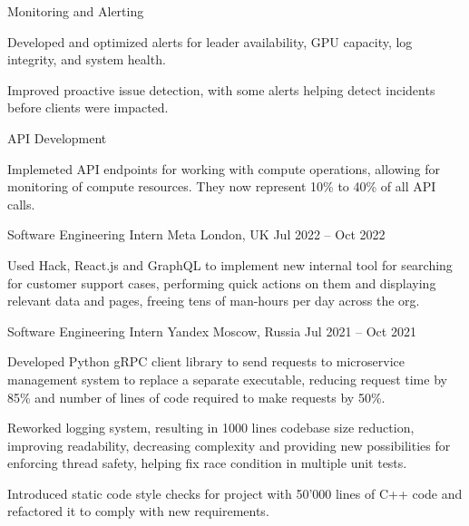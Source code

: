 \begin{cventries}
{\begin{cvitems}
        \item{Monitoring and Alerting}
        \begin{cvitemsnested}
        \item{Developed and optimized alerts for leader availability, GPU capacity, log integrity, and system health.}
        \item{Improved proactive issue detection, with some alerts helping detect incidents before clients were impacted.}
        \end{cvitemsnested}
        \item{API Development}
        \begin{cvitemsnested}
        \item{Implemeted API endpoints for working with compute operations, allowing for monitoring of compute resources. They now represent 10\% to 40\% of all API calls.}
        \end{cvitemsnested}
    \end{cvitems}
  }

  \cventry
  {Software Engineering Intern} %
  {Meta} %
  {London, UK} %
  {Jul 2022 -- Oct 2022} %
  {
    \begin{cvitems} %
      \item Used Hack, React.js and GraphQL to implement new internal tool for searching for customer support cases, performing
      quick actions on them and displaying relevant data and pages, freeing tens of man-hours per day across the org.
    \end{cvitems}
  }

  \cventry
  {Software Engineering Intern} %
  {Yandex} %
  {Moscow, Russia} %
  {Jul 2021 -- Oct 2021} %
  {
    \begin{cvitems} %
      \item Developed Python gRPC client library to send requests to microservice management system to replace a separate executable,
      reducing request time by 85\% and number of lines of code required to make requests by 50\%.
      \item Reworked logging system, resulting in 1000 lines codebase size reduction, improving readability, decreasing complexity
      and providing new possibilities for enforcing thread safety, helping fix race condition in multiple unit tests.
      \item Introduced static code style checks for project with 50'000 lines of C++ code and refactored it to comply with new requirements.
    \end{cvitems}
  }


\end{cventries}
